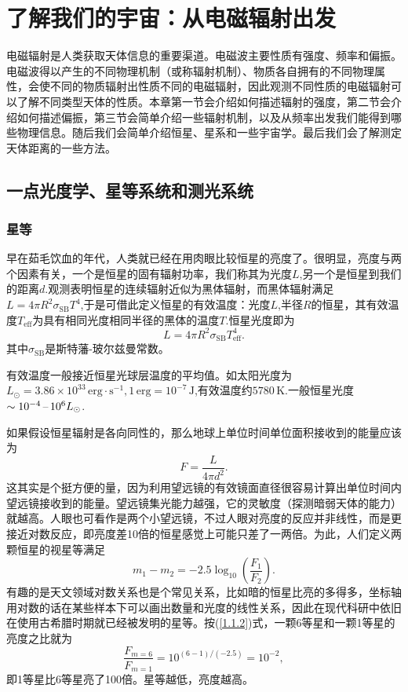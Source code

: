 \documentclass[../天体物理基础.tex]{subfiles}
\begin{document}
\section{了解我们的宇宙：从电磁辐射出发}
电磁辐射是人类获取天体信息的重要渠道。电磁波主要性质有强度、频率和偏振。电磁波得以产生的不同物理机制（或称辐射机制）、物质各自拥有的不同物理属性，会使不同的物质辐射出性质不同的电磁辐射，因此观测不同性质的电磁辐射可以了解不同类型天体的性质。本章第一节会介绍如何描述辐射的强度，第二节会介绍如何描述偏振，第三节会简单介绍一些辐射机制，以及从频率出发我们能得到哪些物理信息。随后我们会简单介绍恒星、星系和一些宇宙学。最后我们会了解测定天体距离的一些方法。

\subsection{一点光度学、星等系统和测光系统}
\subsubsection{星等}
早在茹毛饮血的年代，人类就已经在用肉眼比较恒星的亮度了。很明显，亮度与两个因素有关，一个是恒星的固有辐射功率，我们称其为光度$L$,另一个是恒星到我们的距离$d$.观测表明恒星的连续辐射近似为黑体辐射，而黑体辐射满足$L=4\pi R^{2}\sigma_{\mathrm{SB}}T^{4}$,于是可借此定义恒星的有效温度：光度$L$,半径$R$的恒星，其有效温度$T_{\mathrm{eff}}$为具有相同光度相同半径的黑体的温度$T$.恒星光度即为
\begin{equation}
L=4\pi R^{2}\sigma_{\mathrm{SB}}T_{\text{eff}}^{4}.
\end{equation}
其中$\sigma_{\text{SB}}$是斯特藩-玻尔兹曼常数。

有效温度一般接近恒星光球层温度的平均值。如太阳光度为$L_{\odot}=3.86\times10^{33}\,\mathrm{erg\cdot s^{-1}},1\,\mathrm{erg}=10^{-7}\,\mathrm{J}$,有效温度约$5780\,\mathrm{K}$.一般恒星光度$\sim10^{-4}\,\text{\textendash}\,10^{6}L_{\odot}$.

如果假设恒星辐射是各向同性的，那么地球上单位时间单位面积接收到的能量应该为
\begin{equation}
F=\frac{L}{4\pi d^{2}}.
\end{equation}
这其实是个挺方便的量，因为利用望远镜的有效镜面直径很容易计算出单位时间内望远镜接收到的能量。望远镜集光能力越强，它的灵敏度（探测暗弱天体的能力）就越高。人眼也可看作是两个小望远镜，不过人眼对亮度的反应并非线性，而是更接近对数反应，即亮度差10倍的恒星感觉上可能只差了一两倍。为此，人们定义两颗恒星的视星等满足
\begin{equation}
m_{1}-m_{2}=-2.5\log_{10}\left(\frac{F_{1}}{F_{2}}\right).\label{1.1.2}
\end{equation}
有趣的是天文领域对数关系也是个常见关系，比如暗的恒星比亮的多得多，坐标轴用对数的话在某些样本下可以画出数量和光度的线性关系，因此在现代科研中依旧在使用古希腊时期就已经被发明的星等。按(\ref{1.1.2})式，一颗6等星和一颗1等星的亮度之比就为
\begin{equation}
\frac{F_{m=6}}{F_{m=1}}=10^{\left(6-1\right)/\left(-2.5\right)}=10^{-2},
\end{equation}
即1等星比6等星亮了100倍。星等越低，亮度越高。
\end{document}
